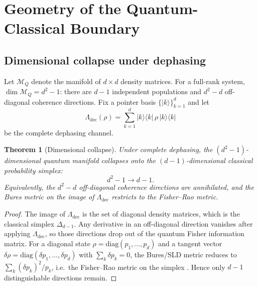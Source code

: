 \documentclass[11pt,a4paper]{article}
\newtheorem{theorem}{Theorem}[section]
\theoremstyle{definition}
\theoremstyle{remark}
\newcommand{\dec}{\Lambda_{\mathrm{dec}}}
\begin{document}
\medskip
\noindent{}
\medskip

\section{Geometry of the Quantum-Classical Boundary}
\label{sec:geometry}

\subsection{Dimensional collapse under dephasing}

Let $\mathcal{M}_Q$ denote the manifold of $d\times d$ density matrices. For a full-rank system, $\dim \mathcal{M}_Q = d^2-1$: there are $d-1$ independent populations and $d^2-d$ off-diagonal coherence directions. Fix a pointer basis $\{\lvert k\rangle\}_{k=1}^d$ and let
\begin{equation}
\label{eq:dephasing}
\dec(\rho)=\sum_{k=1}^d \lvert k\rangle\langle k\rvert\,\rho\,\lvert k\rangle\langle k\rvert
\end{equation}
be the complete dephasing channel.

\begin{theorem}[Dimensional collapse]
\label{thm:collapse}
Under complete dephasing, the $(d^2-1)$-dimensional quantum manifold collapses onto the $(d-1)$-dimensional classical probability simplex:
\begin{equation}
\label{eq:collapse}
d^2-1 \longrightarrow d-1.
\end{equation}
Equivalently, the $d^2-d$ off-diagonal coherence directions are annihilated, and the Bures metric on the image of $\dec$ restricts to the Fisher--Rao metric.
\end{theorem}

\begin{proof}
The image of $\dec$ is the set of diagonal density matrices, which is the classical simplex $\Delta_{d-1}$. Any derivative in an off-diagonal direction vanishes after applying $\dec$, so those directions drop out of the quantum Fisher information matrix. For a diagonal state $\rho=\mathrm{diag}(p_1,\ldots,p_d)$ and a tangent vector $\delta\rho=\mathrm{diag}(\delta p_1,\ldots,\delta p_d)$ with $\sum_k\delta p_k=0$, the Bures/SLD metric reduces to $\sum_k (\delta p_k)^2/p_k$, i.e.\ the Fisher--Rao metric on the simplex \cite{braunstein1994statistical,petz1996monotone,rao1945information}. Hence only $d-1$ distinguishable directions remain.
\end{proof}
\end{document}

